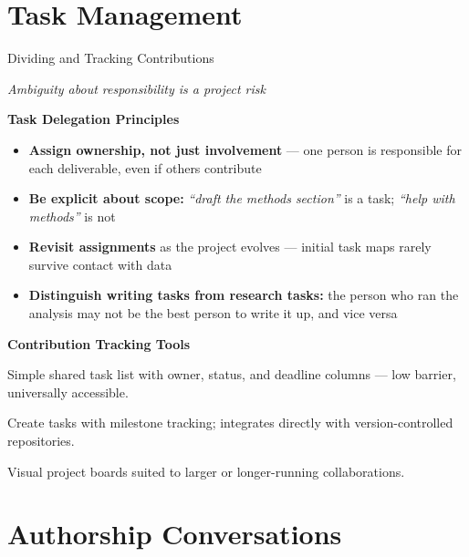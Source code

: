 \documentclass{beamer}
\begin{document}
\section{Task Management}
\begin{frame}{Dividing and Tracking Contributions}

  \footnotesize
  \begin{center}
    \emph{Ambiguity about responsibility is a project risk}
  \end{center}

  \textbf{Task Delegation Principles}
  \begin{itemize}
    \item \textbf{Assign ownership, not just involvement} ---
      one person is responsible for each deliverable, even
      if others contribute
    \item \textbf{Be explicit about scope:} \textit{``draft
      the methods section''} is a task;
      \textit{``help with methods''} is not
    \item \textbf{Revisit assignments} as the project evolves ---
      initial task maps rarely survive contact with data
    \item \textbf{Distinguish writing tasks from research tasks:}
      the person who ran the analysis may not be the best person
      to write it up, and vice versa
  \end{itemize}

  \medskip
  \textbf{Contribution Tracking Tools}
  \begin{description}
    \setlength{\itemsep}{3pt}
    \item[\textbf{Google Sheets}]
      Simple shared task list with owner, status, and
      deadline columns --- low barrier, universally accessible.
    \item[\textbf{GitHub Issues}]
      Create tasks with milestone tracking;
      integrates directly with version-controlled repositories.
    \item[\textbf{Asana/Trello/Notion}]
      Visual project boards suited to larger or
      longer-running collaborations.
  \end{description}

\end{frame}

\section{Authorship Conversations}
\end{document}
